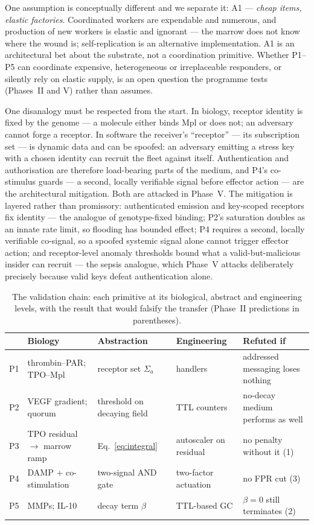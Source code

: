 \documentclass[twoside,twocolumn,usenatbib]{mnras}
\begin{document}
One assumption is conceptually different and we separate it: A1 ---
\emph{cheap items, elastic factories}. Coordinated workers are
expendable and numerous, and production of new workers is elastic and
ignorant --- the marrow does not know where the wound is;
self-replication is an alternative implementation. A1 is an
architectural bet about the substrate, not a coordination primitive.
Whether P1--P5 can coordinate expensive, heterogeneous or
irreplaceable responders, or silently rely on elastic supply, is an
open question the programme tests (Phases~II and V) rather than
assumes.

One disanalogy must be respected from the start. In biology, receptor
identity is fixed by the genome --- a molecule either binds Mpl or does
not; an adversary cannot forge a receptor. In software the receiver's
``receptor'' --- its subscription set --- is dynamic data and can be
spoofed: an adversary emitting a stress key with a chosen identity can
recruit the fleet against itself. Authentication and authorisation are
therefore load-bearing parts of the medium, and P4's co-stimulus
guards --- a second, locally verifiable signal before effector action
--- are the architectural mitigation. Both are attacked in Phase~V.
The mitigation is layered rather than promissory: authenticated
emission and key-scoped receptors fix identity --- the analogue of
genotype-fixed binding; P2's saturation doubles as an innate rate
limit, so flooding has bounded effect; P4 requires a second, locally
verifiable co-signal, so a spoofed systemic signal alone cannot trigger
effector action; and receptor-level anomaly thresholds bound what a
valid-but-malicious insider can recruit --- the sepsis analogue, which
Phase~V attacks deliberately precisely because valid keys defeat
authentication alone.

\begin{table}
\centering
\caption{The validation chain: each primitive at its biological,
abstract and engineering levels, with the result that would falsify
the transfer (Phase~II predictions in parentheses).}
\label{tab:validation}
\footnotesize
\begin{tabular}{@{}lp{16mm}p{16mm}p{16mm}p{17mm}@{}}
\toprule
 & Biology & Abstraction & Engineering & Refuted if \\
\midrule
P1 & thrombin--PAR; TPO--Mpl & receptor set $\Sigma_a$ & handlers & addressed messaging loses nothing \\
P2 & VEGF gradient; quorum & threshold on decaying field & TTL counters & no-decay medium performs as well \\
P3 & TPO residual $\to$ marrow ramp & Eq.~\ref{eq:integral} & autoscaler on residual & no penalty without it (1) \\
P4 & DAMP + co-stimulation & two-signal AND gate & two-factor actuation & no FPR cut (3) \\
P5 & MMPs; IL-10 & decay term $\beta$ & TTL-based GC & $\beta = 0$ still terminates (2) \\
\bottomrule
\end{tabular}
\end{table}
\end{document}
